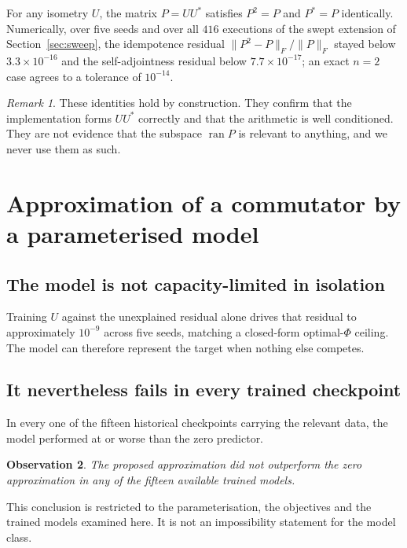 \documentclass[11pt]{amsart}
\newcommand{\norm}[1]{\lVert#1\rVert}
\newcommand{\ran}{\operatorname{ran}}
\newtheorem{observation}{Observation}[section]
\theoremstyle{remark}
\newtheorem{remark}[observation]{Remark}
\begin{document}
For any isometry $U$, the matrix $P=UU^{*}$ satisfies $P^{2}=P$ and $P^{*}=P$ identically.
Numerically, over five seeds and over all $416$ executions of the swept extension of
Section~\ref{sec:sweep}, the idempotence residual $\norm{P^{2}-P}_F/\norm{P}_F$ stayed
below $3.3\times10^{-16}$ and the self-adjointness residual below $7.7\times10^{-17}$; an
exact $n=2$ case agrees to a tolerance of $10^{-14}$.

\begin{remark}
\label{rem:byconstruction}
These identities hold by construction. They confirm that the implementation forms $UU^{*}$
correctly and that the arithmetic is well conditioned. They are not evidence that the
subspace $\ran P$ is relevant to anything, and we never use them as such.
\end{remark}

\section{Approximation of a commutator by a parameterised model}
\label{sec:commutator}

\subsection{The model is not capacity-limited in isolation}

Training $U$ against the unexplained residual alone drives that residual to approximately
$10^{-9}$ across five seeds, matching a closed-form optimal-$\Phi$ ceiling. The model can
therefore represent the target when nothing else competes.

\subsection{It nevertheless fails in every trained checkpoint}

In every one of the fifteen historical checkpoints carrying the relevant data, the model
performed at or worse than the zero predictor.

\begin{observation}
\label{obs:commutator}
The proposed approximation did not outperform the zero approximation in any of the fifteen
available trained models.
\end{observation}

This conclusion is restricted to the parameterisation, the objectives and the trained
models examined here. It is not an impossibility statement for the model class.
\end{document}
